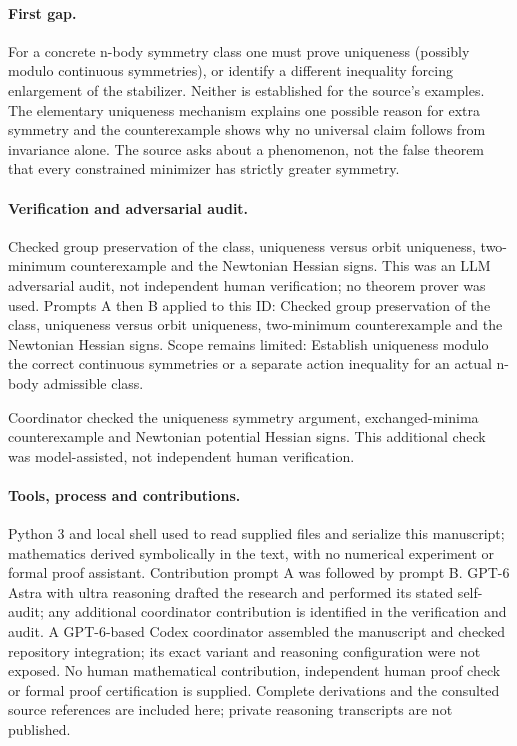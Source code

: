 \documentclass[11pt]{article}
\begin{document}
\paragraph{First gap.}For a concrete n-body symmetry class one must prove uniqueness (possibly modulo continuous symmetries), or identify a different inequality forcing enlargement of the stabilizer. Neither is established for the source's examples. The elementary uniqueness mechanism explains one possible reason for extra symmetry and the counterexample shows why no universal claim follows from invariance alone. The source asks about a phenomenon, not the false theorem that every constrained minimizer has strictly greater symmetry.

\paragraph{Verification and adversarial audit.}
Checked group preservation of the class, uniqueness versus orbit uniqueness, two-minimum counterexample and the Newtonian Hessian signs. This was an LLM adversarial audit, not independent human verification; no theorem prover was used. Prompts A then B applied to this ID: Checked group preservation of the class, uniqueness versus orbit uniqueness, two-minimum counterexample and the Newtonian Hessian signs. Scope remains limited: Establish uniqueness modulo the correct continuous symmetries or a separate action inequality for an actual n-body admissible class.

Coordinator checked the uniqueness symmetry argument, exchanged-minima counterexample and Newtonian potential Hessian signs. This additional check was model-assisted, not independent human verification.

\paragraph{Tools, process and contributions.}
Python 3 and local shell used to read supplied files and serialize this manuscript; mathematics derived symbolically in the text, with no numerical experiment or formal proof assistant. Contribution prompt A was followed by prompt B. GPT-6 Astra with ultra reasoning drafted the research and performed its stated self-audit; any additional coordinator contribution is identified in the verification and audit. A GPT-6-based Codex coordinator assembled the manuscript and checked repository integration; its exact variant and reasoning configuration were not exposed. No human mathematical contribution, independent human proof check or formal proof certification is supplied. Complete derivations and the consulted source references are included here; private reasoning transcripts are not published.
\end{document}
